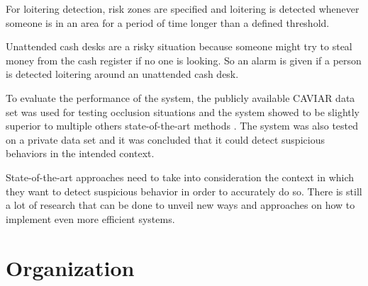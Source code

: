 For loitering detection, risk zones are specified and loitering is detected whenever someone is in an area for a period of time longer than a defined threshold.

Unattended cash desks are a risky situation because someone might try to steal money from the cash register if no one is looking. So an alarm is given if a person is detected loitering around an unattended cash desk.

To evaluate the performance of the system, the publicly available CAVIAR data set was used for testing occlusion situations and the system showed to be slightly superior to multiple others state-of-the-art methods \cite{n13,n14,n15}. The system was also tested on a private data set and it was concluded that it could detect suspicious behaviors in the intended context.

State-of-the-art approaches need to take into consideration the context in which they want to detect suspicious behavior in order to accurately do so. There is still a lot of research that can be done to unveil new ways and approaches on how to implement even more efficient systems.


\section{Organization}



